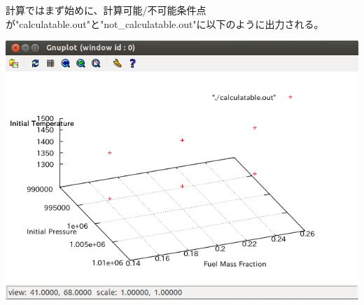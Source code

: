 \documentclass{jsarticle}
\begin{document}
計算ではまず始めに、計算可能/不可能条件点が"calculatable.out"と"not\_calculatable.out"に以下のように出力される。
\begin{center}
\includegraphics[width=.7\textwidth,bb=0 0 652 479]{sample/no24.1.png}
\end{center}
\end{document}
